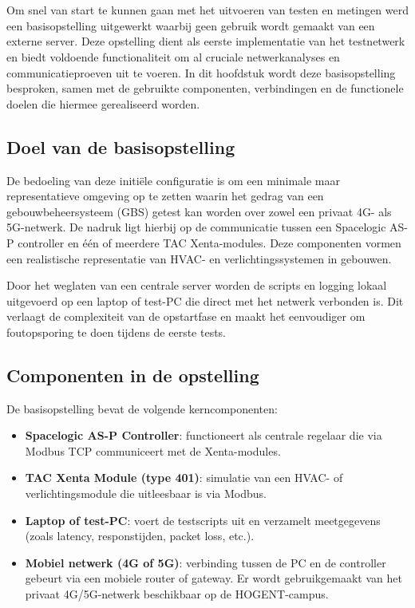 \chapter{}%
\label{ch:basisopstelling}

Om snel van start te kunnen gaan met het uitvoeren van testen en metingen werd een basisopstelling uitgewerkt waarbij geen gebruik wordt gemaakt van een externe server. Deze opstelling dient als eerste implementatie van het testnetwerk en biedt voldoende functionaliteit om al cruciale netwerkanalyses en communicatieproeven uit te voeren. In dit hoofdstuk wordt deze basisopstelling besproken, samen met de gebruikte componenten, verbindingen en de functionele doelen die hiermee gerealiseerd worden.

\section{Doel van de basisopstelling}

De bedoeling van deze initiële configuratie is om een minimale maar representatieve omgeving op te zetten waarin het gedrag van een gebouwbeheersysteem (GBS) getest kan worden over zowel een privaat 4G- als 5G-netwerk. De nadruk ligt hierbij op de communicatie tussen een Spacelogic AS-P controller en één of meerdere TAC Xenta-modules. Deze componenten vormen een realistische representatie van HVAC- en verlichtingssystemen in gebouwen.

Door het weglaten van een centrale server worden de scripts en logging lokaal uitgevoerd op een laptop of test-PC die direct met het netwerk verbonden is. Dit verlaagt de complexiteit van de opstartfase en maakt het eenvoudiger om foutopsporing te doen tijdens de eerste tests.

\section{Componenten in de opstelling}

De basisopstelling bevat de volgende kerncomponenten:
\begin{itemize}
    \item \textbf{Spacelogic AS-P Controller}: functioneert als centrale regelaar die via Modbus TCP communiceert met de Xenta-modules.
    \item \textbf{TAC Xenta Module (type 401)}: simulatie van een HVAC- of verlichtingsmodule die uitleesbaar is via Modbus.
    \item \textbf{Laptop of test-PC}: voert de testscripts uit en verzamelt meetgegevens (zoals latency, responstijden, packet loss, etc.).
    \item \textbf{Mobiel netwerk (4G of 5G)}: verbinding tussen de PC en de controller gebeurt via een mobiele router of gateway. Er wordt gebruikgemaakt van het privaat 4G/5G-netwerk beschikbaar op de HOGENT-campus.
\end{itemize}

